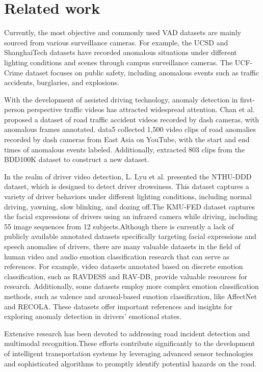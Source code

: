 \section{Related work}
Currently, the most objective and commonly used VAD datasets are mainly sourced from various surveillance cameras. For example, the UCSD\cite{data1} and ShanghaiTech \cite{data2} datasets have recorded anomalous situations under different lighting conditions and scenes through campus surveillance cameras. The UCF-Crime \cite{data3} dataset focuses on public safety, including anomalous events such as traffic accidents, burglaries, and explosions.


With the development of assisted driving technology, anomaly detection in first-person perspective traffic videos has attracted widespread attention. Chan et al.\cite{data4} proposed a dataset of road traffic accident videos recorded by dash cameras, with anomalous frames annotated. {data5} collected 1,500 video clips of road anomalies recorded by dash cameras from East Asia on YouTube, with the start and end times of anomalous events labeled. Additionally, \cite{9022086} extracted 803 clips from the BDD100K\cite{data6} dataset to construct a new dataset.

In the realm of driver video detection, L. Lyu et al. \cite{lyu2018long}presented the NTHU-DDD dataset, which is designed to detect driver drowsiness. This dataset captures a variety of driver behaviors under different lighting conditions, including normal driving, yawning, slow blinking, and dozing off.The KMU-FED dataset \cite{sahoo2023performance} captures the facial expressions of drivers using an infrared camera while driving, including 55 image sequences from 12 subjects.Although there is currently a lack of publicly available annotated datasets specifically targeting facial expressions and speech anomalies of drivers, there are many valuable datasets in the field of human video and audio emotion classification research that can serve as references. For example, video datasets annotated based on discrete emotion classification, such as RAVDESS and RAV-DB\cite{RAVDESS}, provide valuable resources for research. Additionally, some datasets employ more complex emotion classification methods, such as valence and arousal-based emotion classification, like AffectNet\cite{AffectNet} and RECOLA\cite{RECOLA}. These datasets offer important references and insights for exploring anomaly detection in drivers' emotional states.

Extensive research has been devoted to addressing road incident detection and multimodal recognition.These efforts contribute significantly to the development of intelligent transportation systems by leveraging advanced sensor technologies and sophisticated algorithms to promptly identify potential hazards on the road.

